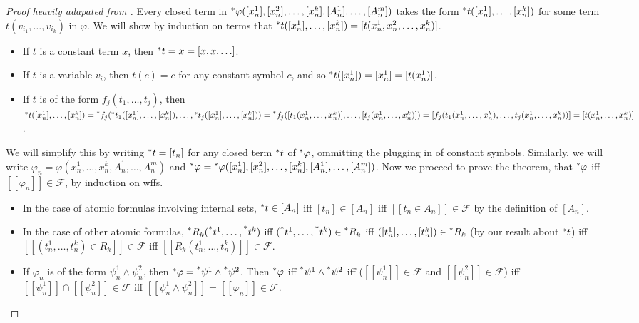 \begin{proof}[Proof heavily adapated from ]
    Every closed term in $\prescript{*}{}{\varphi}([x^1_n], [x^2_n], \ldots, [x^k_n], [A^1_n], \ldots, [A^m_n])$ takes the form $\prescript{*}{}{t}([x^1_n], \ldots, [x^k_n])$ for some term $t(v_{i_1}, \ldots, v_{i_k})$ in $\varphi$. We will show by induction on terms that $\prescript{*}{}{t}([x^1_n], \ldots, [x^k_n]) = [t(x^1_n, x^2_n, \ldots, x^k_n)]$.
    \begin{itemize}
        \item If $t$ is a constant term $x$, then $\prescript{*}{}{t} = x = [x, x, \ldots]$.
        \item If $t$ is a variable $v_i$, then $t(c) = c$ for any constant symbol $c$, and so $\prescript{*}{}{t}([x^1_n]) = [x^1_n] = [t(x^1_n)]$.
        \item If $t$ is of the form $f_j(t_1, \ldots, t_j)$, then $\prescript{*}{}{t}([x^1_n], \ldots, [x^k_n]) = \prescript{*}{}{f_j}(\prescript{*}{}{t_1}([x^1_n], \ldots, [x^k_n]), \ldots, \prescript{*}{}{t_j}([x^1_n], \ldots, [x^k_n])) = \prescript{*}{}{f_j}([t_1(x^1_n, \ldots, x^k_n)], \ldots, [t_j(x^1_n, \ldots, x^k_n)]) = [f_j(t_1(x^1_n, \ldots, x^k_n), \ldots, t_j(x^1_n, \ldots, x^k_n))] = [t(x^1_n, \ldots, x^k_n)]$.
    \end{itemize}
    We will simplify this by writing $\prescript{*}{}{t} = [t_n]$ for any closed term $\prescript{*}{}{t}$ of $\prescript{*}{}{\varphi}$, ommitting the plugging in of constant symbols. Similarly, we will write $\varphi_n = \varphi(x^1_n, \ldots, x^k_n, A^1_n, \ldots, A^m_n)$ and $\prescript{*}{}{\varphi} =  \prescript{*}{}{\varphi}([x^1_n], [x^2_n], \ldots, [x^k_n], [A^1_n], \ldots, [A^m_n])$. Now we proceed to prove the theorem, that $\prescript{*}{}{\varphi}$ iff $[[\varphi_n]] \in \mathcal{F}$, by induction on wffs. 
    \begin{itemize}
        \item In the case of atomic formulas involving internal sets, $\prescript{*}{}{t} \in [A_n]$ iff $[t_n] \in [A_n]$ iff $[[t_n \in A_n]] \in \mathcal{F}$ by the definition of $[A_n]$.

        \item In the case of other atomic formulas, $\prescript{*}{}{R_k}(\prescript{*}{}{t^1}, \ldots, \prescript{*}{}{t^k})$ iff $(\prescript{*}{}{t^1}, \ldots, \prescript{*}{}{t^k}) \in \prescript{*}{}{R_k}$ iff $([t^1_n], \ldots, [t^k_n]) \in \prescript{*}{}{R_k}$ (by our result about $\prescript{*}{}{t}$) iff $[[(t^1_n, \ldots, t^k_n) \in R_k]] \in \mathcal{F}$ iff $[[R_k(t^1_n, \ldots, t^k_n)]] \in \mathcal{F}$.
        
        \item If $\varphi_n$ is of the form $\psi^1_n \land \psi^2_n$, then $\prescript{*}{}{\varphi} = \prescript{*}{}{\psi^1} \land \prescript{*}{}{\psi^2}$. Then $\prescript{*}{}{\varphi}$ iff $\prescript{*}{}{\psi^1} \land \prescript{*}{}{\psi^2}$ iff ($[[\psi^1_n]] \in \mathcal {F}$ and $[[\psi^2_n]] \in \mathcal{F}$) iff $[[\psi^1_n]] \cap [[\psi^2_n]] \in \mathcal{F}$ iff $[[\psi^1_n \land \psi^2_n]] = [[\varphi_n]] \in \mathcal{F}$.
        

\end{itemize}
\end{proof}
